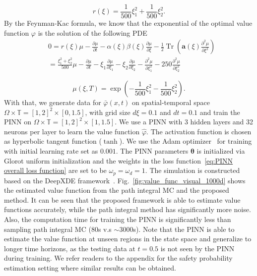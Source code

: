 \documentclass[letterpaper]{article} %
\newcommand{\todo}[1]{\textcolor{blue}{[TODO: #1]}}
\begin{document}
\begin{equation} \label{eq: r_xi_1000d}
    r(\xi) = \frac{1}{500}\xi_1^2 + \frac{1}{500}\xi_2^2.
\end{equation}
By the Feynman-Kac formula, we know that the exponential of the optimal value function $\varphi$ is the solution of the following PDE
\begin{align}
    & 0 = r(\xi)\mu 
    - \frac{\partial \mu}{\partial t} - 
    \alpha(\xi) \beta(\xi) \frac{\partial \mu}{\partial \xi} - \frac{1}{2} \operatorname{Tr} \left(
    \mathbf{a}(\xi) \frac{\partial^2 \mu}{\partial \xi^2} \right) \\
    & = \frac{\xi_1^2 + \xi_2^2}{500}\mu - \frac{\partial \mu}{\partial t} - \xi_1 \frac{\partial \mu}{\partial \xi_1} - \xi_2 \frac{\partial \mu}{\partial \xi_2} - \frac{\partial^2 \mu}{\partial \xi_1^2} - 250 \frac{\partial^2 \mu}{\partial \xi_2^2} \nonumber
\end{align}

\begin{equation}
    \mu(\xi, T) = \exp(- \frac{1}{500}\xi_1^2 - \frac{1}{500}\xi_2^2).
\end{equation}
With that, we generate data for $\bar \varphi(x,t)$ on spatial-temporal space $\Omega \times \mathbb{T} = [1,2]^2 \times [0,1.5]$, with grid size $d\xi = 0.1$ and $dt = 0.1$ and train the PINN on $\Omega \times \mathbb{T} = [1,2]^2 \times [1,1.5]$. 
We use a PINN with 3 hidden layers and 32 neurons per layer to learn the value function $\hat \varphi$. The activation function is chosen as hyperbolic tangent function ($\tanh$). We use the Adam optimizer~\cite{kingma2014adam} for training with initial learning rate set as $0.001$. The PINN parameters $\boldsymbol\theta$ is initialized via Glorot uniform initialization and the weights in the loss function~\eqref{eq:PINN overall loss function} are set to be $\omega_p = \omega_d = 1$. The simulation is constructed based on the DeepXDE framework~\cite{lu2021deepxde}. Fig.~\ref{fig:value_func_visual_1000d} shows the estimated value function from the path integral MC and the proposed method. It can be seen that the proposed framework is able to estimate value functions accurately, while the path integral method has significantly more noise. Also, the computation time for training the PINN is significantly less than sampling path integral MC (80s v.s $\sim$3000s). Note that the PINN is able to estimate the value function at unseen regions in the state space and generalize to longer time horizons, as the testing data at $t = 0.5$ is not seen by the PINN during training. 
We refer readers to the appendix for the safety probability estimation setting where similar results can be obtained. 
\end{document}
